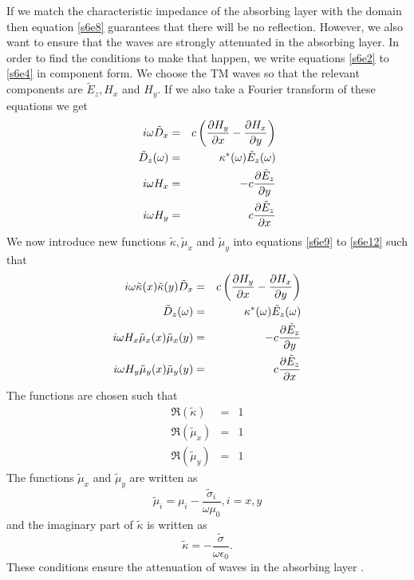 \documentclass[11pt]{article}
\numberwithin{equation}{section}
\begin{document}
If we match the characteristic impedance of the absorbing layer with the
domain then equation \eqref{s6e8} guarantees that there will be no reflection.
However, we also want to ensure that the waves are strongly attenuated in
the absorbing layer. In order to find the conditions to make that happen,
we write equations \eqref{s6e2} to \eqref{s6e4} in component form. We choose 
the TM waves so that the relevant components are $\tilde{E}_z, H_x$ and $H_y$.
If we also take a Fourier transform of these equations we get
\begin{eqnarray}
i\omega\tilde{D}_x &=& c\left(\pdv{H_y}{x} - \pdv{H_x}{y}\right)\label{s6e9} \\
\tilde{D}_z(\omega) &=& \kappa^\ast(\omega)\tilde{E}_z(\omega) \label{s6e10} \\
i\omega H_x &=& -c\pdv{\tilde{E}_z}{y} \label{s6e11} \\
i\omega H_y &=&  c\pdv{\tilde{E}_z}{x} \label{s6e12}
\end{eqnarray}
We now introduce new functions $\tilde{\kappa}, \tilde{\mu}_x$ and
$\tilde{\mu}_y$ into equations \eqref{s6e9} to \eqref{s6e12} such that
\begin{eqnarray}
i\omega\tilde{\kappa}(x)\tilde{\kappa}(y)\tilde{D}_x &=& 
c\left(\pdv{H_y}{x} - \pdv{H_x}{y}\right)\label{s6e13} \\
\tilde{D}_z(\omega) &=& \kappa^\ast(\omega)\tilde{E}_z(\omega) \label{s6e14} \\
i\omega H_x\tilde{\mu}_x(x)\tilde{\mu}_x(y) &=& 
-c\pdv{\tilde{E}_z}{y} \label{s6e15} \\
i\omega H_y\tilde{\mu}_y(x)\tilde{\mu}_y(y)&=&  
c\pdv{\tilde{E}_z}{x} \label{s6e16}
\end{eqnarray}
The functions are chosen such that
\begin{eqnarray}
\Re(\tilde{\kappa}) &=& 1 \label{s6e17} \\
\Re(\tilde{\mu}_x) &=& 1 \label{s6e18} \\
\Re(\tilde{\mu}_y) &=& 1 \label{s6e19}
\end{eqnarray}
The functions $\tilde{\mu}_x$ and $\tilde{\mu}_y$ are written as
\begin{equation}\label{s6e20}
\tilde{\mu}_i = \mu_i - \frac{\tilde{\sigma}_i}{\omega\mu_0}, i = x, y
\end{equation}
and the imaginary part of $\tilde{\kappa}$ is written as
\begin{equation}\label{s6e21}
\tilde{\kappa} = -\frac{\tilde{\sigma}}{\omega\epsilon_0}.
\end{equation}
These conditions ensure the attenuation of waves in the absorbing layer
\cite{sullivan2013electromagnetic}.
\end{document}
